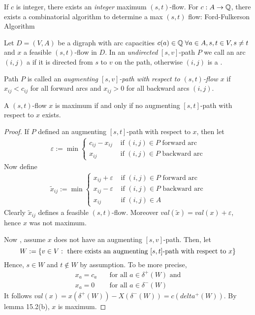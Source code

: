 \begin{cor}
	If $c$ is integer, there exists an \emph{integer} maximum $(s,t)$-flow. For $c: A \rightarrow \mathbb{Q}$, there exists a combinatorial algorithm to determine a max $(s,t)$ flow: Ford-Fulkerson Algorithm
\end{cor}
\begin{defn}
	Let $D = (V,A)$ be a digraph with arc capacities $c(a) \in \mathbb{Q} \; \forall a \in A, s,t \in V, s \not = t$ and $x$ a feasible $(s,t)$-flow in $D$. In an \emph{undirected} $[s,v]$-path $P$ we call an arc $(i,j)$ a  if it is directed from $s$ to $v$ on the path, otherwise $(i,j)$ is a .
	
	Path $P$ is called an \emph{augmenting $[s,v]$-path with respect to $(s,t)$-flow $x$} if $x_{ij} < c_{ij}$ for all forward arcs and $x_{ij} > 0$ for all backward arcs $(i,j)$.
\end{defn}
\begin{thm}
A $(s,t)$-flow $x$ is maximum if and only if no augmenting $[s,t]$-path with respect to $x$ exists.
\end{thm}

\begin{proof}
	If $P$ defined an augmenting $[s,t]$-path with respect to $x$, then let
	\begin{align*}
		\varepsilon := \min \begin{cases}
			c_{ij}-x_{ij} & \text{ if $(i,j) \in P$ forward arc} \\
			x_{ij} & \text{ if $(i,j) \in P$ backward arc}
		\end{cases}
	\end{align*}
	Now define
	\begin{align*}
		\tilde x_{ij} := \min \begin{cases}
			x_{ij} + \varepsilon &\text{ if $(i,j) \in P$ forward arc} \\
			x_{ij} - \varepsilon &\text{ if $(i,j) \in P$ backward arc} \\
			x_{ij} &\text{ if $(i,j) \in A$}
		\end{cases}
	\end{align*}
	Clearly $\tilde x_{ij}$ defines a feasible $(s,t)$-flow. Moreover $val(\tilde x) = val(x) + \varepsilon$, hence $x$ was not maximum.
	
	Now , assume $x$ does not have an augmenting $[s,v]$-path. Then, let
	\[
		W:=\left\{v\in V: \text{ there exists an augmenting $[s,t]$-path with respect to $x$}\right\}
	\]
	Hence, $s \in W$ and $t \not \in W$ by assumption. To be more precise,
	\begin{align*}
		x_a = c_a \quad &\text{for all } a \in \delta^+(W) \text{ and} \\
		x_a = 0 \quad & \text{for all } a \in \delta^-(W)
	\end{align*}
	It follows $val(x) = x ( \delta ^+(W))- X(\delta^-(W)) = c(delta^+(W))$. By lemma 15.2(b), $x$ is maximum.
\end{proof}	
